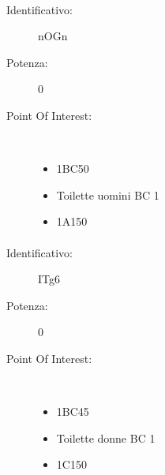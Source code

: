 \documentclass[../SperimentazioniPratiche.tex]{subfiles}
\begin{document}
			\paragraph*{}
			\label{01001}
			\begin{tcolorbox}[fonttitle=\bfseries, 
								adjusted title={\Large Beacon 01001},
								sharp corners=south,
								colback=white, 
								colframe=white!50!blue!75!black]
								
				\begin{description}
					\item[Identificativo:] nOGn
					\item[Potenza:] 0

					\tcbline					
					
					\item[Point Of Interest:] \ \par
					\begin{itemize}
						\item 1BC50
						\item Toilette uomini BC 1
						\item 1A150
					\end{itemize}					   				
				\end{description}  				
			\end{tcolorbox}
			
			\paragraph*{}
			\label{01002}
			\begin{tcolorbox}[fonttitle=\bfseries, 
								adjusted title={\Large Beacon 01002},
								sharp corners=south,
								colback=white, 
								colframe=white!50!blue!75!black]
								
				\begin{description}
					\item[Identificativo:] ITg6
					\item[Potenza:] 0

					\tcbline					
					
					\item[Point Of Interest:] \ \par
					\begin{itemize}
						\item 1BC45
						\item Toilette donne BC 1
						\item 1C150
					\end{itemize}					   				
				\end{description}  				
			\end{tcolorbox}
			
\end{document}
